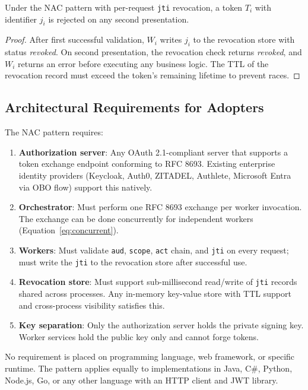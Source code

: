 \documentclass[journal]{IEEEtran}
\begin{document}
\begin{theorem}
Under the NAC pattern with per-request \texttt{jti} revocation, a token $T_i$
with identifier $j_i$ is rejected on any second presentation.
\end{theorem}

\begin{proof}
After first successful validation, $W_i$ writes $j_i$ to the revocation store
with status \textit{revoked}. On second presentation, the revocation check returns
\textit{revoked}, and $W_i$ returns an error before executing any business logic.
The TTL of the revocation record must exceed the token's remaining lifetime to
prevent races.
\end{proof}

\subsection{Architectural Requirements for Adopters}

The NAC pattern requires:

\begin{enumerate}
  \item \textbf{Authorization server}: Any OAuth 2.1-compliant server that
        supports a token exchange endpoint conforming to RFC 8693. Existing
        enterprise identity providers (Keycloak, Auth0, ZITADEL, Authlete,
        Microsoft Entra via OBO flow) support this natively.
  \item \textbf{Orchestrator}: Must perform one RFC 8693 exchange per worker
        invocation. The exchange can be done concurrently for independent workers
        (Equation~\ref{eq:concurrent}).
  \item \textbf{Workers}: Must validate \texttt{aud}, \texttt{scope},
        \texttt{act} chain, and \texttt{jti} on every request; must write the
        \texttt{jti} to the revocation store after successful use.
  \item \textbf{Revocation store}: Must support sub-millisecond read/write of
        \texttt{jti} records shared across processes. Any in-memory key-value
        store with TTL support and cross-process visibility satisfies this.
  \item \textbf{Key separation}: Only the authorization server holds the private
        signing key. Worker services hold the public key only and cannot forge
        tokens.
\end{enumerate}

No requirement is placed on programming language, web framework, or specific
runtime. The pattern applies equally to implementations in Java, C\#, Python,
Node.js, Go, or any other language with an HTTP client and JWT library.
\end{document}
